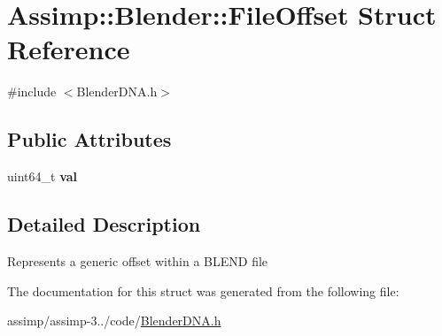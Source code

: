 \hypertarget{struct_assimp_1_1_blender_1_1_file_offset}{\section{Assimp\+:\+:Blender\+:\+:File\+Offset Struct Reference}
\label{struct_assimp_1_1_blender_1_1_file_offset}
}


{\ttfamily \#include $<$Blender\+D\+N\+A.\+h$>$}

\subsection*{Public Attributes}
\begin{DoxyCompactItemize}
\item 
\hypertarget{struct_assimp_1_1_blender_1_1_file_offset_aef0189036b74df38d9097e605e44cdb8}{uint64\+\_\+t {\bfseries val}}\label{struct_assimp_1_1_blender_1_1_file_offset_aef0189036b74df38d9097e605e44cdb8}

\end{DoxyCompactItemize}


\subsection{Detailed Description}
Represents a generic offset within a B\+L\+E\+N\+D file 

The documentation for this struct was generated from the following file\+:\begin{DoxyCompactItemize}
\item 
assimp/assimp-\/3../code/\hyperlink{_blender_d_n_a_8h}{Blender\+D\+N\+A.\+h}\end{DoxyCompactItemize}
